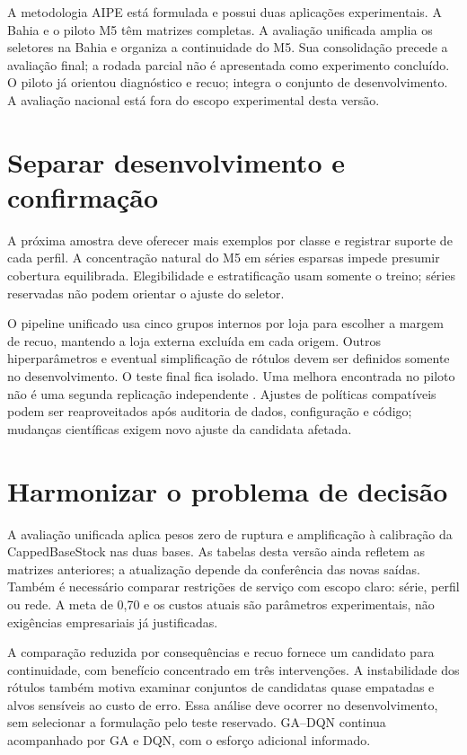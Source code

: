 
A metodologia AIPE está formulada e possui duas aplicações experimentais. A Bahia e o piloto M5 têm matrizes completas. A avaliação unificada amplia os seletores na Bahia e organiza a continuidade do M5. Sua consolidação precede a avaliação final; a rodada parcial não é apresentada como experimento concluído. O piloto já orientou diagnóstico e recuo; integra o conjunto de desenvolvimento. A avaliação nacional está fora do escopo experimental desta versão.

\section{Separar desenvolvimento e confirmação}
\label{sec:estudos_caso_adicionais}
A próxima amostra deve oferecer mais exemplos por classe e registrar suporte de cada perfil. A concentração natural do M5 em séries esparsas impede presumir cobertura equilibrada. Elegibilidade e estratificação usam somente o treino; séries reservadas não podem orientar o ajuste do seletor.

O pipeline unificado usa cinco grupos internos por loja para escolher a margem de recuo, mantendo a loja externa excluída em cada origem. Outros hiperparâmetros e eventual simplificação de rótulos devem ser definidos somente no desenvolvimento. O teste final fica isolado. Uma melhora encontrada no piloto não é uma segunda replicação independente \citep{CawleyTalbot2010}. Ajustes de políticas compatíveis podem ser reaproveitados após auditoria de dados, configuração e código; mudanças científicas exigem novo ajuste da candidata afetada.

\section{Harmonizar o problema de decisão}
A avaliação unificada aplica pesos zero de ruptura e amplificação à calibração da CappedBaseStock nas duas bases. As tabelas desta versão ainda refletem as matrizes anteriores; a atualização depende da conferência das novas saídas. Também é necessário comparar restrições de serviço com escopo claro: série, perfil ou rede. A meta de 0,70 e os custos atuais são parâmetros experimentais, não exigências empresariais já justificadas.

A comparação reduzida por consequências e recuo fornece um candidato para continuidade, com benefício concentrado em três intervenções. A instabilidade dos rótulos também motiva examinar conjuntos de candidatas quase empatadas e alvos sensíveis ao custo de erro. Essa análise deve ocorrer no desenvolvimento, sem selecionar a formulação pelo teste reservado. GA--DQN continua acompanhado por GA e DQN, com o esforço adicional informado.

